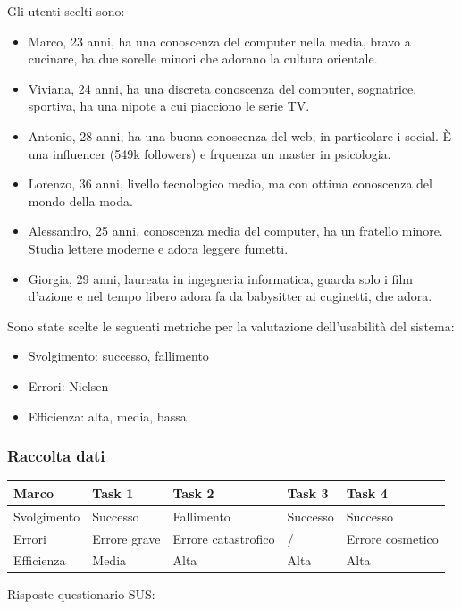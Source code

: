 \documentclass[12pt,italian,]{report}
\providecommand{\tightlist}{%
  \setlength{\itemsep}{0pt}\setlength{\parskip}{0pt}}
\begin{document}
Gli utenti scelti sono:

\begin{itemize}
\tightlist
\item
  Marco, 23 anni, ha una conoscenza del computer nella media, bravo a
  cucinare, ha due sorelle minori che adorano la cultura orientale.
\item
  Viviana, 24 anni, ha una discreta conoscenza del computer, sognatrice,
  sportiva, ha una nipote a cui piacciono le serie TV.
\item
  Antonio, 28 anni, ha una buona conoscenza del web, in particolare i
  social. È una influencer (549k followers) e frquenza un master in
  psicologia.
\item
  Lorenzo, 36 anni, livello tecnologico medio, ma con ottima conoscenza
  del mondo della moda.
\item
  Alessandro, 25 anni, conoscenza media del computer, ha un fratello
  minore. Studia lettere moderne e adora leggere fumetti.
\item
  Giorgia, 29 anni, laureata in ingegneria informatica, guarda solo i
  film d'azione e nel tempo libero adora fa da babysitter ai cuginetti,
  che adora.
\end{itemize}

Sono state scelte le seguenti metriche per la valutazione dell'usabilità
del sistema:

\begin{itemize}
\tightlist
\item
  Svolgimento: successo, fallimento
\item
  Errori: Nielsen
\item
  Efficienza: alta, media, bassa
\end{itemize}

\hypertarget{raccolta-dati}{%
\subsubsection{Raccolta dati}\label{raccolta-dati}}

\begin{longtable}[]{@{}lllll@{}}
\toprule
Marco & Task 1 & Task 2 & Task 3 & Task 4\tabularnewline
\midrule
\endhead
Svolgimento & Successo & Fallimento & Successo & Successo\tabularnewline
Errori & Errore grave & Errore catastrofico & / & Errore
cosmetico\tabularnewline
Efficienza & Media & Alta & Alta & Alta\tabularnewline
\bottomrule
\end{longtable}

Risposte questionario SUS:
\end{document}
